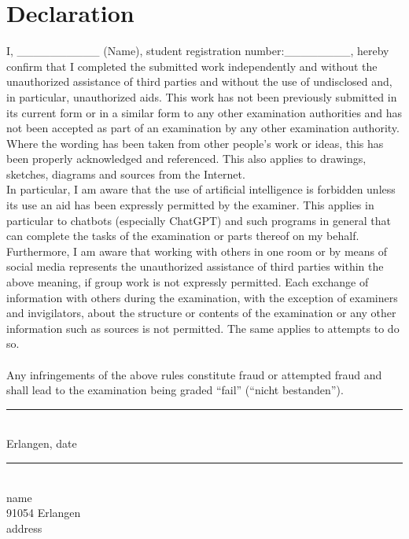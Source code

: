 \chapter*{Declaration}
\thispagestyle{empty}
\noindent
%
I, \_\_\_\_\_\_\_\_\_\_ (Name), student registration number:\_\_\_\_\_\_\_\_, hereby confirm that I completed the submitted work independently and without the unauthorized assistance of third parties and without the use of undisclosed and, in particular, unauthorized aids. This work has not been previously submitted in its current form or in a similar form to any other examination authorities and has not been accepted as part of an examination by any other examination authority.
\\
Where the wording has been taken from other people’s work or ideas, this has been properly acknowledged and referenced. This also applies to drawings, sketches, diagrams and sources from the Internet.
\\
In particular, I am aware that the use of artificial intelligence is forbidden unless its use an aid has been expressly permitted by the examiner. This applies in particular to chatbots (especially ChatGPT) and such programs in general that can complete the tasks of the examination or parts thereof on my behalf.
\\
Furthermore, I am aware that working with others in one room or by means of social media represents the unauthorized assistance of third parties within the above meaning, if group work is not expressly permitted. Each exchange of information with others during the examination, with the exception of examiners and invigilators, about the structure or contents of the examination or any other information such as sources is not permitted. The same applies to attempts to do so.
\\
\\
Any infringements of the above rules constitute fraud or attempted fraud and shall lead to the examination being graded “fail” (“nicht bestanden”).
%
\vspace{2cm}
\\
\begin{minipage}[t]{0.45\textwidth}
    \rule{\textwidth}{0.5pt}\\
	Erlangen, date
\end{minipage}
\hfill
\begin{minipage}[t]{0.45\textwidth}
	\rule{\textwidth}{0.5pt}\\
	name\\
	91054 Erlangen\\
    address \\
\end{minipage}